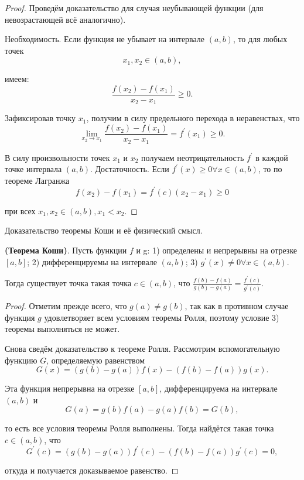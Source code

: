 \begin{proof}
    Проведём доказательство для случая неубывающей функции (для невозрастающей всё аналогично).

    Необходимость. Если функция не убывает на интервале $(a, b)$, то для любых точек
    $$
        x_1, x_2 \in(a, b),
    $$

    имеем:
    $$
        \frac{f\left(x_2\right)-f\left(x_1\right)}{x_2-x_1} \geq 0 .
    $$

    Зафиксировав точку $x_1$, получим в силу предельного перехода в неравенствах, что
    $$
        \lim _{x_2 \rightarrow x_1} \frac{f\left(x_2\right)-f\left(x_1\right)}{x_2-x_1}=f^{\prime}\left(x_1\right) \geq 0 .
    $$

    В силу произвольности точек $x_1$ и $x_2$ получаем неотрицательность $f^{\prime}$ в каждой точке интервала $(a, b)$.
    Достаточность. Если $f^{\prime}(x) \geq 0 \forall x \in(a, b)$, то по теореме Лагранжа
    $$
        f\left(x_2\right)-f\left(x_1\right)=f^{\prime}(c)\left(x_2-x_1\right) \geq 0
    $$

    при всех $x_1, x_2 \in(a, b), x_1<x_2$.
\end{proof}

\newpage

\begin{problem}
Доказательство теоремы Коши и её физический смысл.
\end{problem}
\begin{theorem}\textbf{(Теорема Коши)}.
    Пусть функции $f$ и g:
    1) определены и непрерывны на отрезке $[a, b]$;
    2) дифференцируемы на интервале $(a, b)$;
    3) $g^{\prime}(x) \neq 0 \forall x \in(a, b)$.

    Тогда существует точка такая точка $c \in(a, b)$, что $\frac{f(b)-f(a)}{g(b)-g(a)}=\frac{f^{\prime}(c)}{g^{\prime}(c)}$.
\end{theorem}
\begin{proof}
    Отметим прежде всего, что $g(a) \neq g(b)$, так как в противном случае функция $g$ удовлетворяет всем условиям теоремы Ролля, поэтому условие 3) теоремы выполняться не может.

    Снова сведём доказательство к теореме Ролля. Рассмотрим вспомогательную функцию $G$, определяемую равенством
    $$
        G(x)=(g(b)-g(a)) f(x)-(f(b)-f(a)) g(x) .
    $$

    Эта функция непрерывна на отрезке $[a, b]$, дифференцируема на интервале $(a, b)$ и
    $$
        G(a)=g(b) f(a)-g(a) f(b)=G(b),
    $$

    то есть все условия теоремы Ролля выполнены. Тогда найдётся такая точка $c \in(a, b)$, что
    $$
        G^{\prime}(c)=(g(b)-g(a)) f^{\prime}(c)-(f(b)-f(a)) g^{\prime}(c)=0,
    $$

    откуда и получается доказываемое равенство.
\end{proof}



